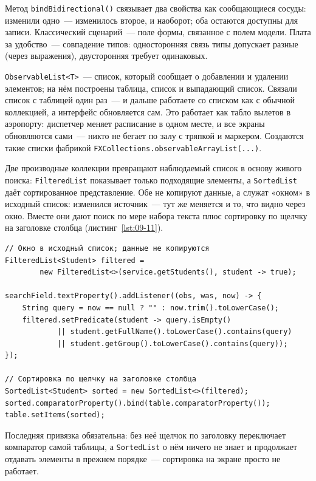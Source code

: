 Метод \texttt{bindBidirectional()} связывает два свойства как сообщающиеся
сосуды: изменили одно~--- изменилось второе, и наоборот; оба остаются доступны
для записи. Классический сценарий~--- поле формы, связанное с полем модели.
Плата за удобство~--- совпадение типов: односторонняя связь типы допускает
разные (через выражения), двусторонняя требует одинаковых.

\texttt{ObservableList<T>}~--- список, который сообщает о добавлении и удалении
элементов; на нём построены таблица, список и выпадающий список. Связали список
с таблицей один раз~--- и дальше работаете со списком как с обычной коллекцией,
а интерфейс обновляется сам. Это работает как табло вылетов в аэропорту:
диспетчер меняет расписание в одном месте, и все экраны обновляются сами~---
никто не бегает по залу с тряпкой и маркером. Создаются такие списки фабрикой
\texttt{FXCollections.observableArrayList(...)}.

Две производные коллекции превращают наблюдаемый список в основу живого поиска:
\texttt{FilteredList} показывает только подходящие элементы, а
\texttt{SortedList} даёт сортированное представление. Обе не копируют данные, а
служат «окном» в исходный список: изменился источник~--- тут же меняется и то,
что видно через окно. Вместе они дают поиск по мере набора текста плюс
сортировку по щелчку на заголовке столбца (листинг~\ref{lst:09-11}).

\begin{listing}[H]
\begin{verbatim}
// Окно в исходный список; данные не копируются
FilteredList<Student> filtered =
        new FilteredList<>(service.getStudents(), student -> true);

searchField.textProperty().addListener((obs, was, now) -> {
    String query = now == null ? "" : now.trim().toLowerCase();
    filtered.setPredicate(student -> query.isEmpty()
            || student.getFullName().toLowerCase().contains(query)
            || student.getGroup().toLowerCase().contains(query));
});

// Сортировка по щелчку на заголовке столбца
SortedList<Student> sorted = new SortedList<>(filtered);
sorted.comparatorProperty().bind(table.comparatorProperty());
table.setItems(sorted);
\end{verbatim}
\caption{Живой поиск и сортировка в таблице}
\label{lst:09-11}
\end{listing}

Последняя привязка обязательна: без неё щелчок по заголовку переключает
компаратор самой таблицы, а \texttt{SortedList} о нём ничего не знает и
продолжает отдавать элементы в прежнем порядке~--- сортировка на экране просто
не работает.

